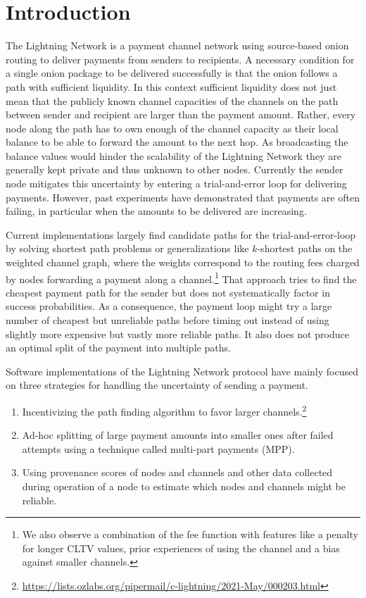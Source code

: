 \documentclass[10pt,twocolumn]{article}
\begin{document}
\section{Introduction}
The Lightning Network is a payment channel network using source-based onion routing to deliver payments from senders to recipients.
A necessary condition for a single onion package to be delivered successfully is that the onion follows a path with sufficient liquidity.
In this context sufficient liquidity does not just mean that the publicly known channel capacities of the channels on the path between sender and recipient are larger than the payment amount. Rather, every node along the path has to own enough of the channel capacity as their local balance to be able to forward the amount to the next hop.
As broadcasting the balance values would hinder the scalability of the Lightning Network they are generally kept private and thus unknown to other nodes.
Currently the sender node mitigates this uncertainty by entering a trial-and-error loop for delivering payments.
However, past experiments have demonstrated that payments are often failing, in particular when the amounts to be delivered are increasing\cite{DBLP:journals/corr/abs-1911-09432,DBLP:journals/corr/abs-2006-14358,lange2021impact, pickhardt2021security}.

Current implementations largely find candidate paths for the trial-and-error-loop by solving
shortest path problems or generalizations like $k$-shortest paths on the
weighted channel graph, where the weights correspond to the routing fees charged by nodes forwarding a payment along a channel.\footnote{We also observe a combination of the fee function with features like a penalty for longer CLTV values, prior experiences of using the channel and a bias against smaller channels.}
That approach tries to find the cheapest payment path for the sender but does not systematically factor in success probabilities. As a consequence, the payment loop might try a large number of cheapest but unreliable paths before timing out instead of using slightly more expensive but vastly more reliable paths. It also does not produce an optimal split of the payment into multiple paths.

Software implementations of the Lightning Network protocol have mainly focused on three strategies for handling the uncertainty of sending a payment.
\begin{enumerate}
\item Incentivizing the path finding algorithm to favor larger channels.\footnote{\url{https://lists.ozlabs.org/pipermail/c-lightning/2021-May/000203.html}}%
\item Ad-hoc splitting of large payment amounts into smaller ones after failed attempts using a technique called multi-part payments (MPP).
\item Using provenance scores of nodes and channels and other data collected during operation of a node to estimate which nodes and channels might be reliable.
\end{enumerate}
\end{document}
